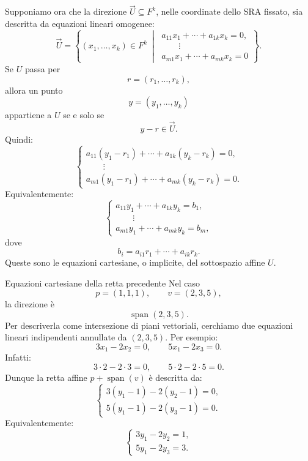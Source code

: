 \documentclass[a4paper]{article}
\begin{document}
Supponiamo ora che la direzione \(\overrightarrow{U}\subseteq F^k\), nelle coordinate dello SRA fissato, sia descritta da equazioni lineari omogenee:
\[
    \overrightarrow{U}
    =
    \left\{
        (x_1,\ldots,x_k)\in F^k
        \ \middle|\
        \begin{array}{c}
            a_{11}x_1+\cdots+a_{1k}x_k=0,\\
            \qquad\vdots\\
            a_{m1}x_1+\cdots+a_{mk}x_k=0
        \end{array}
    \right\}.
\]
Se \(U\) passa per
\[
    r=(r_1,\ldots,r_k),
\]
allora un punto
\[
    y=(y_1,\ldots,y_k)
\]
appartiene a \(U\) se e solo se
\[
    y-r\in \overrightarrow{U}.
\]
Quindi:
\[
    \begin{cases}
        a_{11}(y_1-r_1)+\cdots+a_{1k}(y_k-r_k)=0,\\
        \qquad\vdots\\
        a_{m1}(y_1-r_1)+\cdots+a_{mk}(y_k-r_k)=0.
    \end{cases}
\]
Equivalentemente:
\[
    \begin{cases}
        a_{11}y_1+\cdots+a_{1k}y_k=b_1,\\
        \qquad\vdots\\
        a_{m1}y_1+\cdots+a_{mk}y_k=b_m,
    \end{cases}
\]
dove
\[
    b_i=a_{i1}r_1+\cdots+a_{ik}r_k.
\]
Queste sono le equazioni cartesiane, o implicite, del sottospazio affine \(U\).

\begin{snippetexample}{Equazioni cartesiane della retta precedente}
    Nel caso
    \[
        p=(1,1,1),
        \qquad
        v=(2,3,5),
    \]
    la direzione è
    \[
        \operatorname{span}(2,3,5).
    \]
    Per descriverla come intersezione di piani vettoriali, cerchiamo due equazioni lineari indipendenti annullate da \((2,3,5)\). Per esempio:
    \[
        3x_1-2x_2=0,
        \qquad
        5x_1-2x_3=0.
    \]
    Infatti:
    \[
        3\cdot 2-2\cdot 3=0,
        \qquad
        5\cdot 2-2\cdot 5=0.
    \]
    Dunque la retta affine \(p+\operatorname{span}(v)\) è descritta da:
    \[
        \begin{cases}
            3(y_1-1)-2(y_2-1)=0,\\
            5(y_1-1)-2(y_3-1)=0.
        \end{cases}
    \]
    Equivalentemente:
    \[
        \begin{cases}
            3y_1-2y_2=1,\\
            5y_1-2y_3=3.
        \end{cases}
    \]
\end{snippetexample}
\end{document}
